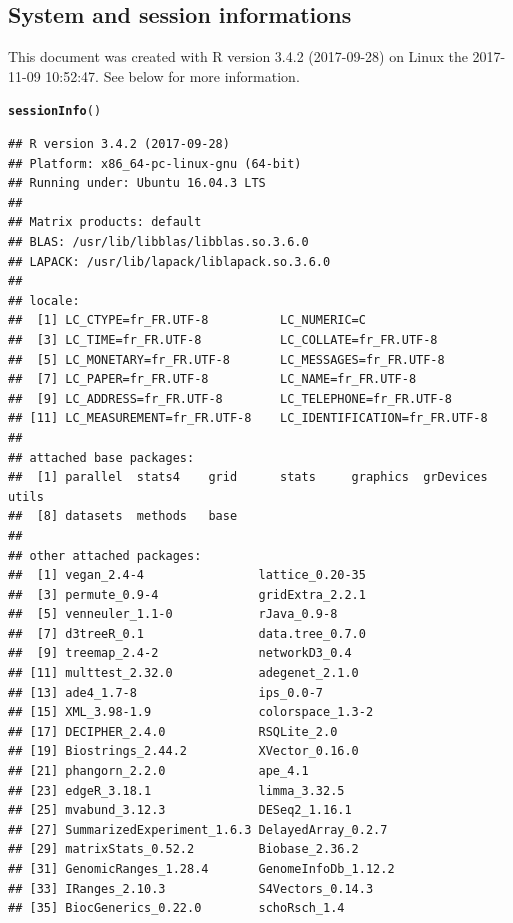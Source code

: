 \documentclass[12pt]{article}\usepackage[]{graphicx}\usepackage[]{color}
\makeatletter
\newcommand{\hlstd}[1]{\textcolor[rgb]{0.345,0.345,0.345}{#1}}%
\newcommand{\hlkwd}[1]{\textcolor[rgb]{0.737,0.353,0.396}{\textbf{#1}}}%
\newenvironment{kframe}{%
 \def\at@end@of@kframe{}%
 \ifinner\ifhmode%
  \def\at@end@of@kframe{\end{minipage}}%
  \begin{minipage}{\columnwidth}%
 \fi\fi%
 \def\FrameCommand##1{\hskip\@totalleftmargin \hskip-\fboxsep
 \colorbox{shadecolor}{##1}\hskip-\fboxsep
     \hskip-\linewidth \hskip-\@totalleftmargin \hskip\columnwidth}%
 \MakeFramed {\advance\hsize-\width
   \@totalleftmargin\z@ \linewidth\hsize
   \@setminipage}}%
 {\par\unskip\endMakeFramed%
 \at@end@of@kframe}
\newenvironment{knitrout}{}{} %
\numberwithin{figure}{section}
\makeatother
\begin{document}
  \subsection{System and session informations}
  This document was created with R version 3.4.2 (2017-09-28) on Linux the 2017-11-09 10:52:47. See below for more information.
\begin{knitrout}\tiny
{}\color{fgcolor}\begin{kframe}
\begin{alltt}
\hlkwd{sessionInfo}\hlstd{()}
\end{alltt}
\begin{verbatim}
## R version 3.4.2 (2017-09-28)
## Platform: x86_64-pc-linux-gnu (64-bit)
## Running under: Ubuntu 16.04.3 LTS
## 
## Matrix products: default
## BLAS: /usr/lib/libblas/libblas.so.3.6.0
## LAPACK: /usr/lib/lapack/liblapack.so.3.6.0
## 
## locale:
##  [1] LC_CTYPE=fr_FR.UTF-8          LC_NUMERIC=C                 
##  [3] LC_TIME=fr_FR.UTF-8           LC_COLLATE=fr_FR.UTF-8       
##  [5] LC_MONETARY=fr_FR.UTF-8       LC_MESSAGES=fr_FR.UTF-8      
##  [7] LC_PAPER=fr_FR.UTF-8          LC_NAME=fr_FR.UTF-8          
##  [9] LC_ADDRESS=fr_FR.UTF-8        LC_TELEPHONE=fr_FR.UTF-8     
## [11] LC_MEASUREMENT=fr_FR.UTF-8    LC_IDENTIFICATION=fr_FR.UTF-8
## 
## attached base packages:
##  [1] parallel  stats4    grid      stats     graphics  grDevices utils    
##  [8] datasets  methods   base     
## 
## other attached packages:
##  [1] vegan_2.4-4                lattice_0.20-35           
##  [3] permute_0.9-4              gridExtra_2.2.1           
##  [5] venneuler_1.1-0            rJava_0.9-8               
##  [7] d3treeR_0.1                data.tree_0.7.0           
##  [9] treemap_2.4-2              networkD3_0.4             
## [11] multtest_2.32.0            adegenet_2.1.0            
## [13] ade4_1.7-8                 ips_0.0-7                 
## [15] XML_3.98-1.9               colorspace_1.3-2          
## [17] DECIPHER_2.4.0             RSQLite_2.0               
## [19] Biostrings_2.44.2          XVector_0.16.0            
## [21] phangorn_2.2.0             ape_4.1                   
## [23] edgeR_3.18.1               limma_3.32.5              
## [25] mvabund_3.12.3             DESeq2_1.16.1             
## [27] SummarizedExperiment_1.6.3 DelayedArray_0.2.7        
## [29] matrixStats_0.52.2         Biobase_2.36.2            
## [31] GenomicRanges_1.28.4       GenomeInfoDb_1.12.2       
## [33] IRanges_2.10.3             S4Vectors_0.14.3          
## [35] BiocGenerics_0.22.0        schoRsch_1.4              

\end{verbatim}
\end{kframe}
\end{knitrout}
\end{document}
